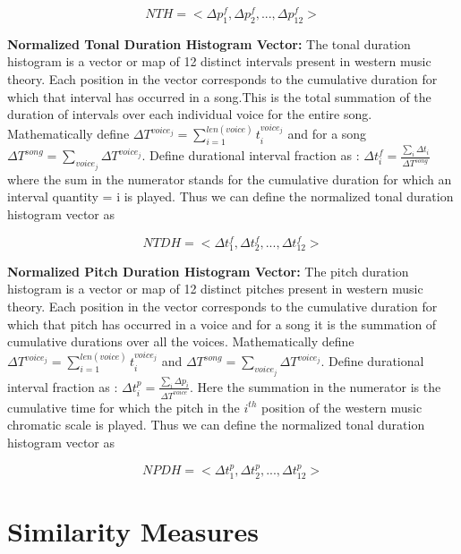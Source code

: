 \begin{equation}
NTH = <\Delta p^f_1, \Delta p^f_2, ... , \Delta p^f_{12}>
\end{equation}

\noindent \textbf{Normalized Tonal Duration Histogram Vector:} The tonal duration histogram is a vector or map of 12 distinct intervals present in western music theory. Each position in the vector corresponds to the cumulative duration for which that interval has occurred in a song.This is the total summation of the duration of intervals over each individual voice for the entire song. Mathematically define $\Delta T^{voice_j} = \sum_{i=1}^{len(voice)} t_i^{voice_j}$ and for a song $\Delta T^{song} = \sum_{voice_j} \Delta T^{voice_j}$. Define durational interval fraction as : $\Delta t^f_i = \frac{\sum_i \Delta t_i}{\Delta T^{song}}$ where the sum in the numerator stands for the cumulative duration for which an interval quantity = i is played. Thus we can define the normalized tonal duration histogram vector as

\begin{equation}
NTDH = <\Delta t^f_1, \Delta t^f_2, ... , \Delta t^f_{12}>
\end{equation}

\noindent \textbf{Normalized Pitch Duration Histogram Vector:}  The pitch duration histogram is a vector or map of 12 distinct pitches present in western music theory. Each position in the vector corresponds to the cumulative duration for which that pitch has occurred in a voice and for a song it is the summation of cumulative durations over all the voices. Mathematically define $\Delta T^{voice_j} = \sum_{i=1}^{len(voice)} t_i^{voice_j}$ and $\Delta T^{song} = \sum_{voice_j} \Delta T^{voice_j}$. Define durational interval fraction as : $\Delta t^p_i = \frac{\sum_i \Delta p_i}{\Delta T^{voice}}$. Here the summation in the numerator is the cumulative time for which the pitch in the $i^{th}$ position of the western music chromatic scale is played. Thus we can define the normalized tonal duration histogram vector as

\begin{equation} \label{NPDH}
NPDH = <\Delta t^p_1, \Delta t^p_2, ... , \Delta t^p_{12}>
\end{equation}


\section{Similarity Measures} \label{similarity}

